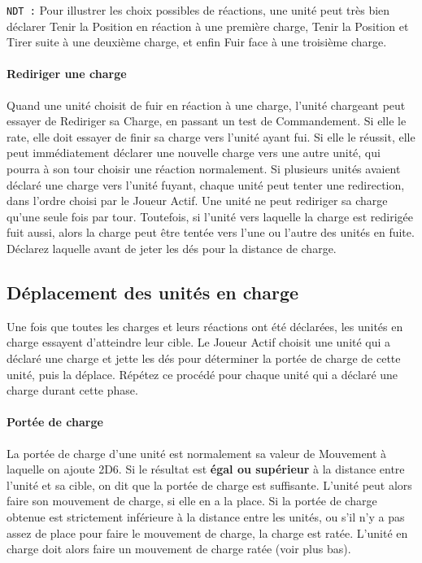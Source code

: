 \texttt{NDT :} Pour illustrer les choix possibles de réactions, une unité peut très bien déclarer Tenir la Position en réaction à une première charge, Tenir la Position et Tirer suite à une deuxième charge, et enfin Fuir face à une troisième charge.

\paragraph{Rediriger une charge}

Quand une unité choisit de fuir en réaction à une charge, l'unité chargeant peut essayer de Rediriger sa Charge, en passant un test de Commandement. Si elle le rate, elle doit essayer de finir sa charge vers l'unité ayant fui. Si elle le réussit, elle peut immédiatement déclarer une nouvelle charge vers une autre unité, qui pourra à son tour choisir une réaction normalement. Si plusieurs unités avaient déclaré une charge vers l'unité fuyant, chaque unité peut tenter une redirection, dans l'ordre choisi par le Joueur Actif. Une unité ne peut rediriger sa charge qu'une seule fois par tour. Toutefois, si l'unité vers laquelle la charge est redirigée fuit aussi, alors la charge peut être tentée vers l'une ou l'autre des unités en fuite. Déclarez laquelle avant de jeter les dés pour la distance de charge.

\newpage
\hypertarget{movechargers}{\subsection{Déplacement des unités en charge}}
\label{move_chargers}

Une fois que toutes les charges et leurs réactions ont été déclarées, les unités en charge essayent d'atteindre leur cible. Le Joueur Actif choisit une unité qui a déclaré une charge et jette les dés pour déterminer la portée de charge de cette unité, puis la déplace. Répétez ce procédé pour chaque unité qui a déclaré une charge durant cette phase.

\paragraph{Portée de charge}

La portée de charge d'une unité est normalement sa valeur de Mouvement à laquelle on ajoute 2D6. Si le résultat est \textbf{égal ou supérieur} à la distance entre l'unité et sa cible, on dit que la portée de charge est suffisante. L'unité peut alors faire son mouvement de charge, si elle en a la place. Si la portée de charge obtenue est strictement inférieure à la distance entre les unités, ou s'il n'y a pas assez de place pour faire le mouvement de charge, la charge est ratée. L'unité en charge doit alors faire un mouvement de charge ratée (voir plus bas).

